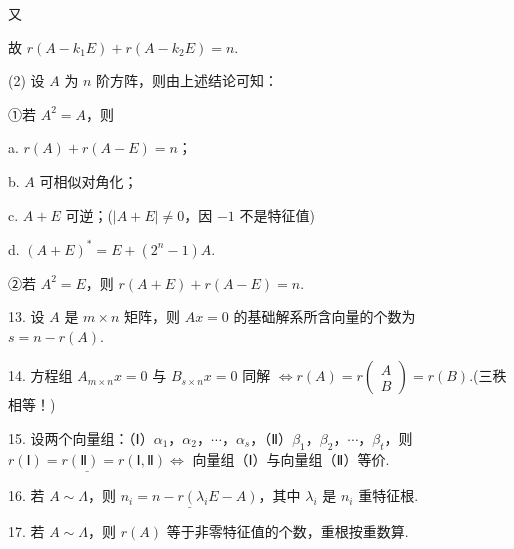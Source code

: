 \begin{fnote}

又


故 $r(A-k_1E)+r(A-k_2E)=n$.

(2) 设 $A$ 为 $n$ 阶方阵，则由上述结论可知：

①若 $A^2=A$，则

a. $r(A)+r(A-E)=n$；

b. $A$ 可相似对角化；

c. $A+E$ 可逆；\quad($|A+E|\ne0$，因 $-1$ 不是特征值)

d. $(A+E)^{*}=E+(2^n-1)A$.

②若 $A^2=E$，则 $r(A+E)+r(A-E)=n$.
\end{fnote}

13. 设 $A$ 是 $m\times n$ 矩阵，则 $Ax=0$ 的基础解系所含向量的个数为 $s=n-r(A)$.

14. 方程组 $A_{m\times n}x=0$ 与 $B_{s\times n}x=0$ 同解 $\Leftrightarrow r(A)=r\begin{pmatrix}A\\B\end{pmatrix}=r(B)$.\quad(三秩相等！)

15. 设两个向量组：（Ⅰ）$\alpha_1$，$\alpha_2$，$\cdots$，$\alpha_s$，（Ⅱ）$\beta_1$，$\beta_2$，$\cdots$，$\beta_t$，则 $\underline{r(\text{Ⅰ})=r(\text{Ⅱ})=r(\text{Ⅰ},\text{Ⅱ})}\Leftrightarrow$ 向量组（Ⅰ）与向量组（Ⅱ）等价.

16. 若 $A\sim\Lambda$，则 $\underline{n_i=n-r(\lambda_iE-A)}$，其中 $\lambda_i$ 是 $n_i$ 重特征根.

17. 若 $A\sim\Lambda$，则 $r(A)$ 等于非零特征值的个数，重根按重数算.

